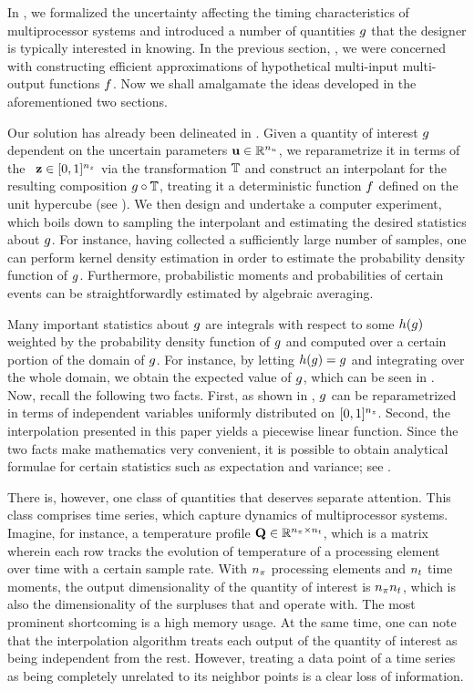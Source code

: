 In , we formalized the uncertainty affecting the timing
characteristics of multiprocessor systems and introduced a number of quantities
$g$ that the designer is typically interested in knowing. In the previous
section, , we were concerned with constructing efficient
approximations of hypothetical multi-input multi-output functions $f$. Now we
shall amalgamate the ideas developed in the aforementioned two sections.

Our solution has already been delineated in . Given a quantity of
interest $g$ dependent on the uncertain parameters $\mathbf{u} \in \mathbb{R}^{n_u}$, we
reparametrize it in terms of the \rvs\ $\mathbf{z} \in [0, 1]^{n_z}$ via the
transformation $\mathbb{T}$ and construct an interpolant for the resulting
composition $g \circ \mathbb{T}$, treating it a deterministic function
$f$ defined on the unit hypercube (see ). We then
design and undertake a computer experiment, which boils down to sampling the
interpolant and estimating the desired statistics about $g$. For instance,
having collected a sufficiently large number of samples, one can perform kernel
density estimation in order to estimate the probability density function of
$g$. Furthermore, probabilistic moments and probabilities of certain events can
be straightforwardly estimated by algebraic averaging.

\begin{remark}
Many important statistics about $g$ are integrals with respect to some $h(g)$
weighted by the probability density function of $g$ and computed over a certain
portion of the domain of $g$. For instance, by letting $h(g) = g$ and
integrating over the whole domain, we obtain the expected value of $g$, which
can be seen in . Now, recall the following two facts. First,
as shown in , $g$ can be reparametrized in terms of
independent variables uniformly distributed on $[0, 1]^{n_z}$. Second, the
interpolation presented in this paper yields a piecewise linear function. Since
the two facts make mathematics very convenient, it is possible to obtain
analytical formulae for certain statistics such as expectation and variance; see
\cite{ma2009}.
\end{remark}

There is, however, one class of quantities that deserves separate attention.
This class comprises time series, which capture dynamics of multiprocessor
systems. Imagine, for instance, a temperature profile $\mathbf{Q} \in \mathbb{R}^{{n_\pi} \times
{n_t}}$, which is a matrix wherein each row tracks the evolution of temperature of
a processing element over time with a certain sample rate. With ${n_\pi}$ processing
elements and ${n_t}$ time moments, the output dimensionality of the quantity of
interest is ${n_\pi}{n_t}$, which is also the dimensionality of the surpluses that
 and  operate with. The most prominent
shortcoming is a high memory usage. At the same time, one can note that the
interpolation algorithm treats each output of the quantity of interest as being
independent from the rest. However, treating a data point of a time series as
being completely unrelated to its neighbor points is a clear loss of
information.

